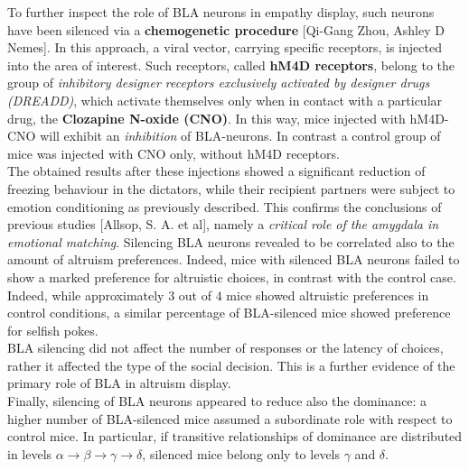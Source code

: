 \documentclass[a4paper]{article}
\begin{document}
To further inspect the role of BLA neurons in empathy display, such neurons have been silenced via a \textbf{chemogenetic procedure} [Qi-Gang Zhou, Ashley D Nemes]. In this approach, a viral vector, carrying specific receptors, is injected into the area of interest. Such receptors, called  \textbf{hM4D receptors}, belong to the group of \textit{inhibitory designer receptors exclusively activated by designer drugs (DREADD)}, which activate themselves only when in contact with a particular drug, the \textbf{Clozapine N-oxide (CNO)}. In this way, mice injected with hM4D-CNO will exhibit an \textit{inhibition} of BLA-neurons. In contrast a control group of mice was injected with CNO only, without hM4D receptors.\\
The obtained results after these injections showed a significant reduction of freezing behaviour in the dictators, while their recipient partners were subject to emotion conditioning as previously described. This confirms the conclusions of previous studies [Allsop, S. A. et al], namely a \textit{critical role of the amygdala in emotional matching}. Silencing BLA neurons revealed to be correlated also to the amount of altruism preferences. Indeed, mice with silenced BLA neurons failed to show a marked preference for altruistic choices, in contrast with the control case. Indeed, while approximately $3$ out of $4$ mice showed altruistic preferences in control conditions, a similar percentage of BLA-silenced mice showed preference for selfish pokes.\\
BLA silencing did not affect the number of responses or the latency of choices, rather it affected the type of the social decision. This is a further evidence of the primary role of BLA in altruism display.
\\
Finally,  silencing of BLA neurons appeared to reduce also the dominance: a higher number of BLA-silenced mice assumed a subordinate role with respect to control mice. In particular, if transitive relationships of dominance are distributed in levels $ \alpha \rightarrow \beta \rightarrow \gamma \rightarrow \delta $, silenced mice belong only to levels $ \gamma $ and $ \delta $.
\end{document}

